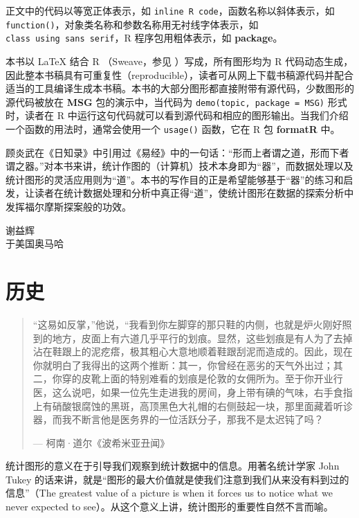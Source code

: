 \documentclass[
  b5paper,
  UTF8,twoside]{book}
\begin{document}
正文中的代码以等宽正体表示，如 \texttt{inline\ R\ code}，函数名称以斜体表示，如 \texttt{function()}，对象类名称和参数名称用无衬线字体表示，如 \texttt{class\ using\ sans\ serif}，R 程序包用粗体表示，如 \textbf{package}。

本书以 LaTeX 结合 R （Sweave，参见 \citet{Leisch02} ）写成，所有图形均为 R 代码动态生成，因此整本书稿具有可重复性（reproducible），读者可从网上下载书稿源代码并配合适当的工具编译生成本书稿。本书的大部分图形都直接附带有源代码，少数图形的源代码被放在 \textbf{MSG} 包的演示中，当代码为 \texttt{demo(\textquotesingle{}topic\textquotesingle{},\ package\ =\ \textquotesingle{}MSG\textquotesingle{})} 形式时，读者在 R 中运行这句代码就可以看到源代码和相应的图形输出。当我们介绍一个函数的用法时，通常会使用一个 \texttt{usage()} 函数，它在 R 包 \textbf{formatR} 中。

顾炎武在《日知录》中引用过《易经》中的一句话：``形而上者谓之道，形而下者谓之器。''对本书来讲，统计作图的（计算机）技术本身即为``器''，而数据处理以及统计图形的灵活应用则为``道''。本书的写作目的正是希望能够基于``器''的练习和启发，让读者在统计数据处理和分析中真正得``道''，使统计图形在数据的探索分析中发挥福尔摩斯探案般的功效。

\begin{flushright}
谢益辉\\
于美国奥马哈
\end{flushright}

\hypertarget{cha:history}{%
\chapter{历史}\label{cha:history}}

\begin{quote}
``这易如反掌，''他说，``我看到你左脚穿的那只鞋的内侧，也就是炉火刚好照到的地方，皮面上有六道几乎平行的划痕。显然，这些划痕是有人为了去掉沾在鞋跟上的泥疙瘩，极其粗心大意地顺着鞋跟刮泥而造成的。因此，现在你就明白了我得出的这两个推断：其一，你曾经在恶劣的天气外出过；其二，你穿的皮靴上面的特别难看的划痕是伦敦的女佣所为。至于你开业行医，这么说吧，如果一位先生走进我的房间，身上带有碘的气味，右手食指上有硝酸银腐蚀的黑斑，高顶黑色大礼帽的右侧鼓起一块，那里面藏着听诊器，而我不断言他是医务界的一位活跃分子，那我不是太迟钝了吗？

\hspace*{\fill} --- 柯南·道尔《波希米亚丑闻》
\end{quote}

统计图形的意义在于引导我们观察到统计数据中的信息。用著名统计学家 John Tukey 的话来讲，就是``图形的最大价值就是使我们注意到我们从来没有料到过的信息''（The greatest value of a picture is when it forces us to notice what we never expected to see）。从这个意义上讲，统计图形的重要性自然不言而喻。
\end{document}
